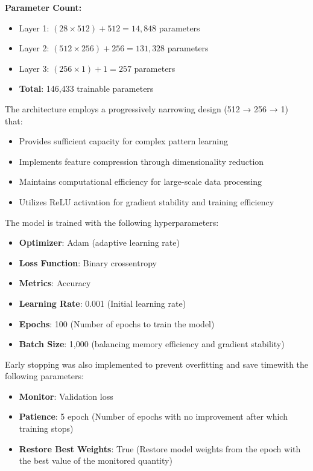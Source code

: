 \documentclass[12pt,a4paper]{article}
\begin{document}
\textbf{Parameter Count:}
\begin{itemize}
    \item Layer 1: $(28 \times 512) + 512 = 14,848$ parameters
    \item Layer 2: $(512 \times 256) + 256 = 131,328$ parameters
    \item Layer 3: $(256 \times 1) + 1 = 257$ parameters
    \item \textbf{Total}: 146,433 trainable parameters
\end{itemize}

The architecture employs a progressively narrowing design (512 → 256 → 1) that:
\begin{itemize}
    \item Provides sufficient capacity for complex pattern learning
    \item Implements feature compression through dimensionality reduction
    \item Maintains computational efficiency for large-scale data processing
    \item Utilizes ReLU activation for gradient stability and training efficiency
\end{itemize}

The model is trained with the following hyperparameters:
\begin{itemize}
    \item \textbf{Optimizer}: Adam (adaptive learning rate)
    \item \textbf{Loss Function}: Binary crossentropy
    \item \textbf{Metrics}: Accuracy
    \item \textbf{Learning Rate}: 0.001 (Initial learning rate)
    \item \textbf{Epochs}: 100 (Number of epochs to train the model)
    \item \textbf{Batch Size}: 1,000 (balancing memory efficiency and gradient stability)
\end{itemize}

Early stopping was also implemented to prevent overfitting and save timewith the following parameters:

\begin{itemize}
    \item \textbf{Monitor}: Validation loss
    \item \textbf{Patience}: 5 epoch (Number of epochs with no improvement after which training stops)
    \item \textbf{Restore Best Weights}: True (Restore model weights from the epoch with the best value of the monitored quantity)
\end{itemize}
\end{document}
